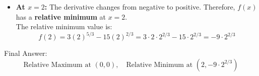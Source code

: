 \documentclass[11pt, a4paper]{article}
\begin{document}
\begin{description}
\begin{itemize}
        \item \textbf{At $x = 2$:} The derivative changes from negative to positive. Therefore, $f(x)$ has a \textbf{relative minimum} at $x = 2$. \\
        The relative minimum value is:
        \[ f(2) = 3(2)^{5/3} - 15(2)^{2/3} = 3 \cdot 2 \cdot 2^{2/3} - 15 \cdot 2^{2/3} = -9 \cdot 2^{2/3} \]
    \end{itemize}
\end{description}

Final Answer:
\[ 
\boxed{\text{Relative Maximum at } (0, 0), \quad \text{Relative Minimum at } (2, -9\cdot 2^{2/3})} 
\]

\end{document}
